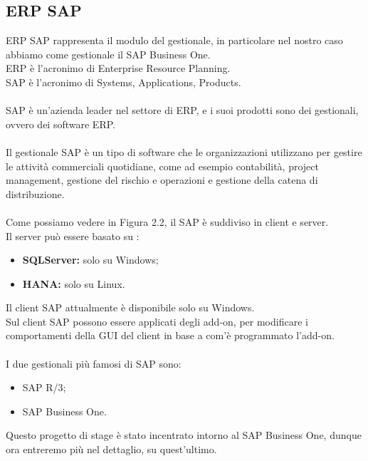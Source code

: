\subsection{ERP SAP}
\vspace{1em}
ERP SAP rappresenta il modulo del gestionale, in particolare nel nostro caso abbiamo come gestionale il SAP Business One.\\
ERP è l'acronimo di Enterprise Resource Planning.\\SAP è l'acronimo di Systems, Applications, Products.\\\\
SAP è un'azienda leader nel settore di ERP, e i suoi prodotti sono dei gestionali, ovvero dei software ERP.\\\\
Il gestionale SAP è un tipo di software che le organizzazioni utilizzano per gestire le attività commerciali quotidiane, come ad esempio contabilità, project management, gestione del rischio e operazioni e gestione della catena di distribuzione.\\\\
Come possiamo vedere in Figura 2.2, il SAP è suddiviso in client e server.\\
Il server può essere basato su :
\begin{itemize}
	\item \textbf{SQLServer:} solo su Windows;
	\item \textbf{HANA:} solo su Linux.
\end{itemize}
Il client SAP attualmente è disponibile solo su Windows.\\Sul client SAP possono essere applicati degli add-on, per modificare i comportamenti della GUI del client in base a com'è programmato l'add-on.\\\\
I due gestionali più famosi di SAP sono:
\begin{itemize}
	\item SAP R/3;
	\item SAP Business One.
\end{itemize}
Questo progetto di stage è stato incentrato intorno al SAP Business One, dunque ora entreremo più nel dettaglio, su quest'ultimo.
\newpage

